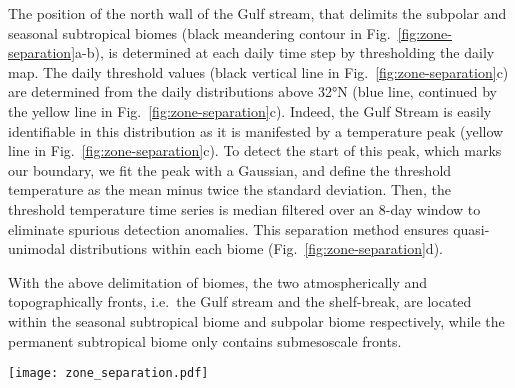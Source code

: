 The position of the north wall of the Gulf stream, that delimits the subpolar and seasonal subtropical biomes (black meandering contour in Fig.~\ref{fig:zone-separation}a-b), is determined at each daily time step by thresholding the daily  map.
The daily threshold values (black vertical line in Fig.~\ref{fig:zone-separation}c) are determined from the daily  distributions above 32°N (blue line, continued by the yellow line in Fig.~\ref{fig:zone-separation}c).
Indeed, the Gulf Stream is easily identifiable in this distribution as it is manifested by a temperature peak (yellow line in Fig.~\ref{fig:zone-separation}c).
To detect the start of this peak, which marks our boundary, we fit the peak with a Gaussian, and define the threshold temperature as the mean minus twice the standard deviation.
Then, the threshold temperature time series is median filtered over an 8-day window to eliminate spurious detection anomalies.
This separation method ensures quasi-unimodal  distributions within each biome (Fig.~\ref{fig:zone-separation}d).

With the above delimitation of biomes, the two atmospherically and topographically fronts, i.e.\ the Gulf stream and the shelf-break, are located within the seasonal subtropical biome and subpolar biome respectively, while the permanent subtropical biome only contains submesoscale fronts.

\begin{figure*}
  \texttt{[image: zone\_separation.pdf]}
  \caption{
    Delimitation of the three biomes in the Gulf stream extension region: the Permanent Subtropical Biome (PSB, south of the dashed line at 32°N), the Seasonal Subtropical Biome (SSB, between 32°N and the meandering Gulf stream northern wall on that day marked with the black contour), and the Subpolar Biome (PB, north of the Gulf stream northern wall).
    (a)  and (b)  snapshots on the 22 April 2007 (with data masked by clouds in white), (c)  and (d)   distribution within each biome for the same day (PB:\@blue, SSB:\@yellow, PSB:\@red).
    The black line in (c) shows the  threshold value detected to delimit the Gulf Stream northern wall (see methods section).
    The x-axis of the distributions correspond to the x-axis scale of the corresponding color bars.
    The red line follows the 1500m isobath.
    Data on the continental shelf (< 1500m) is not considered here and have been masked.
  }%
  \label{fig:zone-separation}
\end{figure*}

